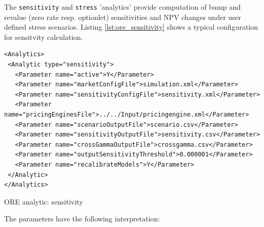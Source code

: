 \documentclass[12pt, a4paper]{article}
\begin{document}
{\medskip The {\tt sensitivity} and {\tt stress} 'analytics' provide computation of bump and revalue (zero rate
resp. optionlet) sensitivities and NPV changes under user defined stress scenarios. Listing \ref{lst:ore_sensitivity}
shows a typical configuration for sensitvity calculation.

\begin{listing}[H]
\begin{verbatim}
<Analytics>
 <Analytic type="sensitivity">
   <Parameter name="active">Y</Parameter>
   <Parameter name="marketConfigFile">simulation.xml</Parameter>
   <Parameter name="sensitivityConfigFile">sensitivity.xml</Parameter>
   <Parameter name="pricingEnginesFile">../../Input/pricingengine.xml</Parameter>
   <Parameter name="scenarioOutputFile">scenario.csv</Parameter>
   <Parameter name="sensitivityOutputFile">sensitivity.csv</Parameter>
   <Parameter name="crossGammaOutputFile">crossgamma.csv</Parameter>
   <Parameter name="outputSensitivityThreshold">0.000001</Parameter>
   <Parameter name="recalibrateModels">Y</Parameter>
 </Analytic>
</Analytics>
\end{verbatim}
\caption{ORE analytic: sensitivity}
\label{lst:ore_sensitivity}
\end{listing}

The parameters have the following interpretation:

}
\end{document}
